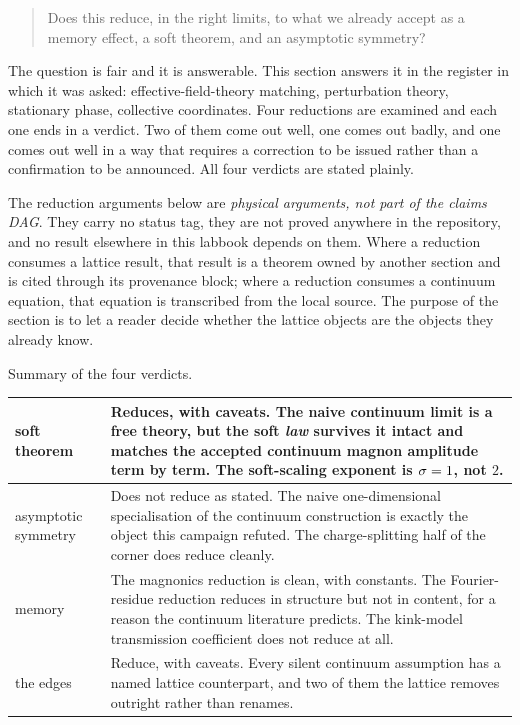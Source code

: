 \begin{quote}
Does this reduce, in the right limits, to what we already accept as a memory
effect, a soft theorem, and an asymptotic symmetry?
\end{quote}

The question is fair and it is answerable. This section answers it in the
register in which it was asked: effective-field-theory matching, perturbation
theory, stationary phase, collective coordinates. Four reductions are examined
and each one ends in a verdict. Two of them come out well, one comes out badly,
and one comes out well in a way that requires a correction to be issued rather
than a confirmation to be announced. All four verdicts are stated plainly.

\begin{remark}
\label{rem:reduction-status}
The reduction arguments below are \emph{physical arguments, not part of the
claims DAG}. They carry no status tag, they are not proved anywhere in the
repository, and no result elsewhere in this labbook depends on them. Where a
reduction consumes a lattice result, that result is a theorem owned by another
section and is cited through its provenance block; where a reduction consumes a
continuum equation, that equation is transcribed from the local source. The
purpose of the section is to let a reader decide whether the lattice objects are
the objects they already know.
\end{remark}

\bigskip

\noindent Summary of the four verdicts.

\begin{center}
\begin{tabular}{@{}p{}p{}@{}}
\toprule
soft theorem & Reduces, with caveats. The naive continuum limit is a free
theory, but the soft \emph{law} survives it intact and matches the accepted
continuum magnon amplitude term by term. The soft-scaling exponent is
$\sigma=1$, not $2$. \\
\midrule
asymptotic symmetry & Does not reduce as stated. The naive one-dimensional
specialisation of the continuum construction is exactly the object this campaign
refuted. The charge-splitting half of the corner does reduce cleanly. \\
\midrule
memory & The magnonics reduction is clean, with constants. The Fourier-residue
reduction reduces in structure but not in content, for a reason the continuum
literature predicts. The kink-model transmission coefficient does not reduce at
all. \\
\midrule
the edges & Reduce, with caveats. Every silent continuum assumption has a named
lattice counterpart, and two of them the lattice removes outright rather than
renames. \\
\bottomrule
\end{tabular}
\end{center}

